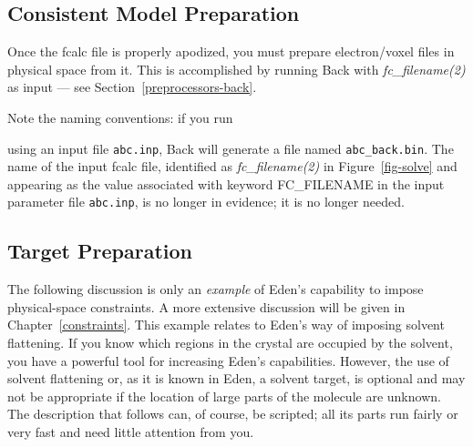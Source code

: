\documentclass{report}
\begin{document}

\subsection {Consistent Model Preparation}
\label{solver-preparation-consistent}

\vspace {0.1in}

Once the fcalc file is properly apodized,
you must prepare electron/voxel files in physical space from it. 
This is accomplished by running Back with {\it fc\_filename(2)} 
as input --- see Section~\ref{preprocessors-back}.  

\vspace {0.1in}

Note the naming conventions: if you run


using an input file {\tt abc.inp}, Back will generate a file named
{\tt abc\_back.bin}.  The name of the input fcalc file,
identified as {\it fc\_filename(2)} in Figure~\ref{fig-solve}
and appearing as the value associated with keyword 
FC\_FILENAME in
the input parameter file {\tt abc.inp},
is no longer in evidence; it is no longer needed.

\subsection {Target Preparation}
\label{solver-preparation-targets}

The following discussion is only an {\em example} of Eden's capability to
impose physical-space constraints.  A more extensive discussion
will be given in Chapter~\ref{constraints}.
This example relates to Eden's way of imposing solvent flattening.
If you know which regions in the crystal are occupied by the solvent,
you have a powerful tool for increasing Eden's capabilities.  
However, the use of 
solvent flattening or, as it is known in Eden, a solvent target,
is optional and may not be appropriate
if the location of large parts of the molecule are unknown.
The description that follows can, of course, be scripted;
all its parts run fairly or very fast and need little attention from you.  

\vspace {0.1in}
\end{document}
